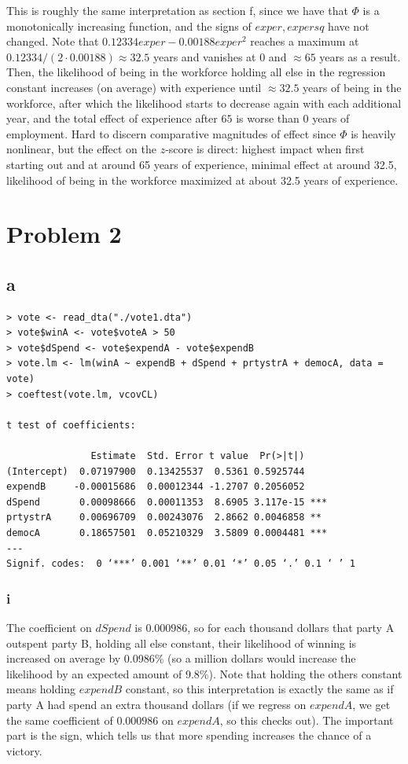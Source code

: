 \documentclass[12pt,letterpaper]{article}
\theoremstyle{definition}
\begin{document}
This is roughly the same interpretation as section f, since we have that $\Phi$ is a monotonically increasing function, and the signs of $exper, expersq$ have not changed. Note that $0.12334exper - 0.00188exper^{2}$ reaches a maximum at $0.12334 / (2 \cdot 0.00188) \approx 32.5$ years and vanishes at 0 and $\approx 65$ years as a result. Then, the likelihood of being in the workforce holding all else in the regression constant increases (on average) with experience until $\approx 32.5$ years of being in the workforce, after which the likelihood starts to decrease again with each additional year, and the total effect of experience after $65$ is worse than 0 years of employment. Hard to discern comparative magnitudes of effect since $\Phi$ is heavily nonlinear, but the effect on the $z$-score is direct: highest impact when first starting out and at around 65 years of experience, minimal effect at around 32.5, likelihood of being in the workforce maximized at about 32.5 years of experience.

\section*{Problem 2}
\subsection*{a}

\begin{Verbatim}[fontsize=\small]
> vote <- read_dta("./vote1.dta")
> vote$winA <- vote$voteA > 50
> vote$dSpend <- vote$expendA - vote$expendB
> vote.lm <- lm(winA ~ expendB + dSpend + prtystrA + democA, data = vote)
> coeftest(vote.lm, vcovCL)

t test of coefficients:

               Estimate  Std. Error t value  Pr(>|t|)
(Intercept)  0.07197900  0.13425537  0.5361 0.5925744
expendB     -0.00015686  0.00012344 -1.2707 0.2056052
dSpend       0.00098666  0.00011353  8.6905 3.117e-15 ***
prtystrA     0.00696709  0.00243076  2.8662 0.0046858 **
democA       0.18657501  0.05210329  3.5809 0.0004481 ***
---
Signif. codes:  0 ‘***’ 0.001 ‘**’ 0.01 ‘*’ 0.05 ‘.’ 0.1 ‘ ’ 1
\end{Verbatim}

\subsubsection*{i}

The coefficient on $dSpend$ is $0.000986$, so for each thousand dollars that party A outspent party B, holding all else constant, their likelihood of winning is increased on average by 0.0986\% (so a million dollars would increase the likelihood by an expected amount of 9.8\%). Note that holding the others constant means holding $expendB$ constant, so this interpretation is exactly the same as if party A had spend an extra thousand dollars (if we regress on $expendA$, we get the same coefficient of $0.000986$ on $expendA$, so this checks out). The important part is the sign, which tells us that more spending increases the chance of a victory.
\end{document}
